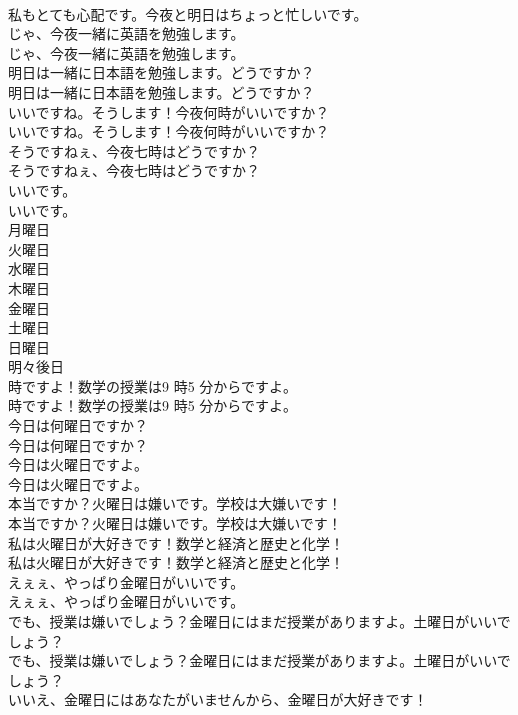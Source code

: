 \documentclass[8pt]{extreport}
\begin{document}
\begin{CJK}{UTF8}{min}
\\	私もとても心配です。今夜と明日はちょっと忙しいです。 
\\	じゃ、今夜一緒に英語を勉強します。	
\\	じゃ、今夜一緒に英語を勉強します。 
\\	明日は一緒に日本語を勉強します。どうですか？	
\\	明日は一緒に日本語を勉強します。どうですか？ 
\\	いいですね。そうします！今夜何時がいいですか？	
\\	いいですね。そうします！今夜何時がいいですか？ 
\\	そうですねぇ、今夜七時はどうですか？	
\\	そうですねぇ、今夜七時はどうですか？ 
\\	いいです。	
\\	いいです。 
\\	月曜日
\\	火曜日
\\	水曜日
\\	木曜日
\\	金曜日
\\	土曜日
\\	日曜日
\\	明々後日
\\	時ですよ！数学の授業は9 時5 分からですよ。	
\\	時ですよ！数学の授業は9 時5 分からですよ。 
\\	今日は何曜日ですか？	
\\	今日は何曜日ですか？ 
\\	今日は火曜日ですよ。	
\\	今日は火曜日ですよ。 
\\	本当ですか？火曜日は嫌いです。学校は大嫌いです！	
\\	本当ですか？火曜日は嫌いです。学校は大嫌いです！ 
\\	私は火曜日が大好きです！数学と経済と歴史と化学！	
\\	私は火曜日が大好きです！数学と経済と歴史と化学！ 
\\	えぇぇ、やっぱり金曜日がいいです。	
\\	えぇぇ、やっぱり金曜日がいいです。 
\\	でも、授業は嫌いでしょう？金曜日にはまだ授業がありますよ。土曜日がいいでしょう？	
\\	でも、授業は嫌いでしょう？金曜日にはまだ授業がありますよ。土曜日がいいでしょう？ 
\\	いいえ、金曜日にはあなたがいませんから、金曜日が大好きです！	

\end{CJK}
\end{document}
